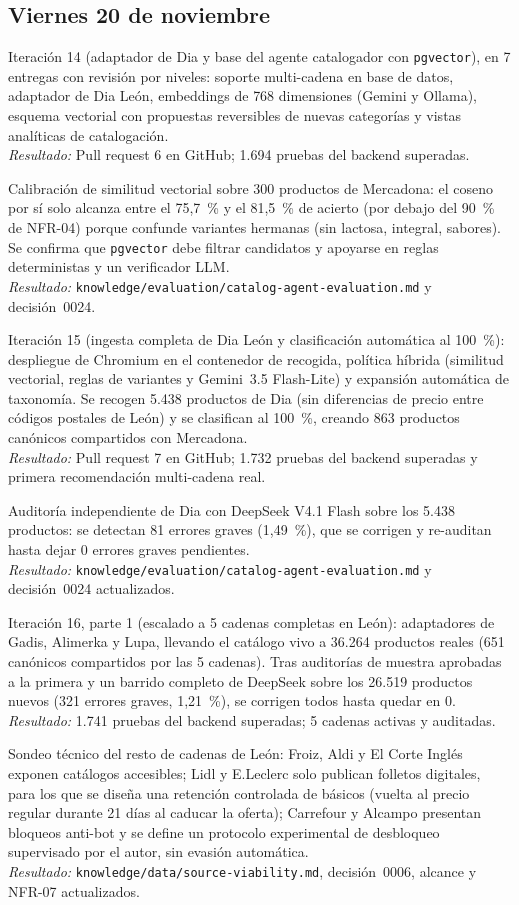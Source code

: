 \documentclass[11pt,a4paper]{article}
\newcommand{\actividad}[3]{\item[\textbf{[#1]}] #2 \\ \textit{Resultado:} #3}
\begin{document}
	\subsection*{Viernes 20 de noviembre}
	\begin{description}[leftmargin=0pt, itemsep=6pt]
		\actividad{Tarea}{Iteración 14 (adaptador de Dia y base del agente catalogador con \texttt{pgvector}), en 7 entregas con revisión por niveles: soporte multi-cadena en base de datos, adaptador de Dia León, embeddings de 768 dimensiones (Gemini y Ollama), esquema vectorial con propuestas reversibles de nuevas categorías y vistas analíticas de catalogación.}{Pull request 6 en GitHub; 1.694 pruebas del backend superadas.}
		\actividad{Análisis}{Calibración de similitud vectorial sobre 300 productos de Mercadona: el coseno por sí solo alcanza entre el 75,7~\% y el 81,5~\% de acierto (por debajo del 90~\% de NFR-04) porque confunde variantes hermanas (sin lactosa, integral, sabores). Se confirma que \texttt{pgvector} debe filtrar candidatos y apoyarse en reglas deterministas y un verificador LLM.}{\texttt{knowledge/evaluation/catalog-agent-evaluation.md} y decisión~0024.}
		\actividad{Tarea}{Iteración 15 (ingesta completa de Dia León y clasificación automática al 100~\%): despliegue de Chromium en el contenedor de recogida, política híbrida (similitud vectorial, reglas de variantes y Gemini~3.5 Flash-Lite) y expansión automática de taxonomía. Se recogen 5.438 productos de Dia (sin diferencias de precio entre códigos postales de León) y se clasifican al 100~\%, creando 863 productos canónicos compartidos con Mercadona.}{Pull request 7 en GitHub; 1.732 pruebas del backend superadas y primera recomendación multi-cadena real.}
		\actividad{Análisis}{Auditoría independiente de Dia con DeepSeek V4.1 Flash sobre los 5.438 productos: se detectan 81 errores graves (1,49~\%), que se corrigen y re-auditan hasta dejar 0 errores graves pendientes.}{\texttt{knowledge/evaluation/catalog-agent-evaluation.md} y decisión~0024 actualizados.}
		\actividad{Tarea}{Iteración 16, parte 1 (escalado a 5 cadenas completas en León): adaptadores de Gadis, Alimerka y Lupa, llevando el catálogo vivo a 36.264 productos reales (651 canónicos compartidos por las 5 cadenas). Tras auditorías de muestra aprobadas a la primera y un barrido completo de DeepSeek sobre los 26.519 productos nuevos (321 errores graves, 1,21~\%), se corrigen todos hasta quedar en 0.}{1.741 pruebas del backend superadas; 5 cadenas activas y auditadas.}
		\actividad{Investigación}{Sondeo técnico del resto de cadenas de León: Froiz, Aldi y El Corte Inglés exponen catálogos accesibles; Lidl y E.Leclerc solo publican folletos digitales, para los que se diseña una retención controlada de básicos (vuelta al precio regular durante 21 días al caducar la oferta); Carrefour y Alcampo presentan bloqueos anti-bot y se define un protocolo experimental de desbloqueo supervisado por el autor, sin evasión automática.}{\texttt{knowledge/data/source-viability.md}, decisión~0006, alcance y NFR-07 actualizados.}
	\end{description}
\end{document}
